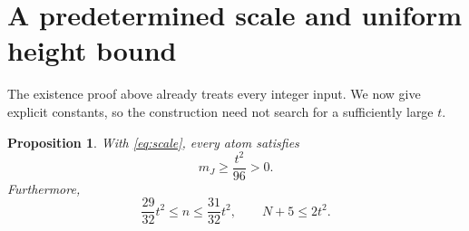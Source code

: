 \documentclass[11pt,a4paper]{article}
\newtheorem{proposition}[theorem]{Proposition}
\theoremstyle{definition}
\begin{document}
\section{A predetermined scale and uniform height bound}\label{sec:effective}

The existence proof above already treats every integer input.
We now give explicit constants, so the construction need not search for
a sufficiently large $t$.

\begin{proposition}\label{prop:effective}
With \eqref{eq:scale}, every atom satisfies
\begin{equation}\label{eq:atomexplicit}
 m_J\ge\frac{t^2}{96}>0.
\end{equation}
Furthermore,
\begin{equation}\label{eq:Nnexplicit}
 \frac{29}{32}t^2\le n\le\frac{31}{32}t^2,\qquad
 N+5\le2t^2.
\end{equation}
\end{proposition}
\end{document}
